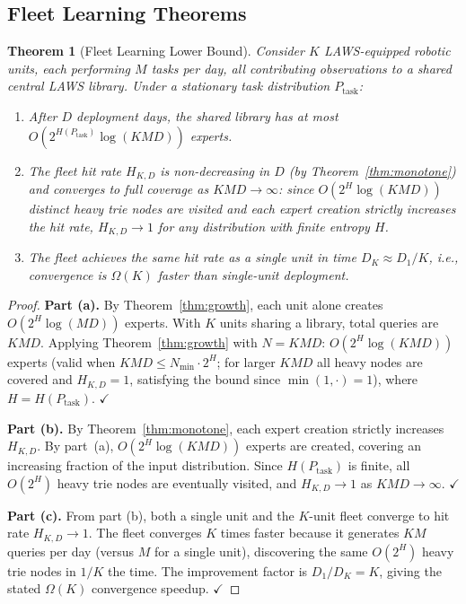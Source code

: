 \documentclass[11pt]{article}
\newtheorem{theorem}{Theorem}
\begin{document}
\subsection{Fleet Learning Theorems}

\begin{theorem}[Fleet Learning Lower Bound]
\label{thm:fleet}
Consider $K$ LAWS-equipped robotic units, each performing $M$ tasks per day,
all contributing observations to a shared central LAWS library.  Under a
stationary task distribution $P_{\mathrm{task}}$:
\begin{enumerate}[leftmargin=2em,label=(\alph*)]
  \item After $D$ deployment days, the shared library has at most
        $O(2^{H(P_{\mathrm{task}})} \log(KMD))$ experts.
  \item The fleet hit rate $H_{K,D}$ is non-decreasing in $D$ (by
  Theorem~\ref{thm:monotone}) and converges to full coverage as $KMD \to \infty$:
  since $O(2^H \log(KMD))$ distinct heavy trie nodes are visited and each expert
  creation strictly increases the hit rate, $H_{K,D} \to 1$ for any distribution
  with finite entropy $H$.
  \item The fleet achieves the same hit rate as a single unit in time
  $D_K \approx D_1 / K$, i.e., convergence is
  $\Omega(K)$ faster than single-unit deployment.
\end{enumerate}
\end{theorem}

\begin{proof}
\textbf{Part (a).}  By Theorem~\ref{thm:growth}, each unit alone creates
$O(2^H \log(MD))$ experts.  With $K$ units sharing a library, total queries
are $KMD$.  Applying Theorem~\ref{thm:growth} with $N = KMD$:
$O(2^H \log(KMD))$ experts (valid when $KMD \leq N_{\min} \cdot 2^H$; for larger $KMD$ all heavy nodes are covered and $H_{K,D} = 1$, satisfying the bound since $\min(1,\cdot) = 1$), where $H = H(P_{\mathrm{task}})$. $\checkmark$

\textbf{Part (b).}  By Theorem~\ref{thm:monotone}, each expert creation
strictly increases $H_{K,D}$.  By part~(a), $O(2^H \log(KMD))$ experts are
created, covering an increasing fraction of the input distribution.
Since $H(P_{\mathrm{task}})$ is finite, all $O(2^H)$ heavy trie nodes are
eventually visited, and $H_{K,D} \to 1$ as $KMD \to \infty$. $\checkmark$

\textbf{Part (c).}  From part (b), both a single unit and the $K$-unit fleet
converge to hit rate $H_{K,D} \to 1$.  The fleet converges $K$ times faster
because it generates $KM$ queries per day (versus $M$ for a single unit),
discovering the same $O(2^H)$ heavy trie nodes in $1/K$ the time.
The improvement factor is $D_1/D_K = K$, giving the stated $\Omega(K)$
convergence speedup. $\checkmark$
\end{proof}
\end{document}
